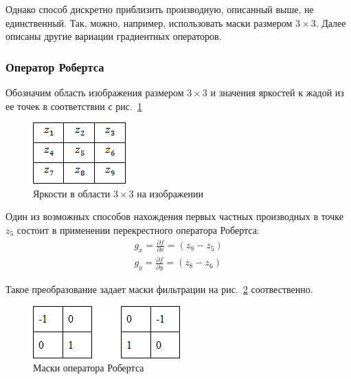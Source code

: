 \documentclass[12pt,a4paper]{article} %
\begin{document}
Однако способ дискретно приблизить производную, описанный выше, не единственный. Так, можно, например, использовать маски размером $3\times3$. Далее описаны другие вариации градиентных операторов.

\subsubsection{Оператор Робертса}

Обозначим область изображения размером $3\times 3$ и значения яркостей к жадой из ее точек в соответствии с рис.~\ref{fig:grad_mask_3}

\begin{figure}[h]
	
	\centering
	
	\includegraphics[width=0.2\linewidth]{grad_mask_3.jpg}
	
	\caption{Яркости в области $3\times3$ на изображении}
	
	\label{fig:grad_mask_3}
	
\end{figure}

Один из возможных способов нахождения первых частных производных в точке~$z_5$ состоит в применении перекрестного оператора Робертса:
\begin{gather}\label{grad_mask_3}
	g_x = \frac{\partial f}{\partial x} = (z_9-z_5)\\
	g_y = \frac{\partial f}{\partial y} = (z_8-z_6)
\end{gather}

Такое преобразование задает маски фильтрации на рис.~\ref{fig:grad_mask_rob} соотвественно.

\begin{figure}[h]
	
	\centering
	
	\includegraphics[width=0.25\linewidth]{grad_mask_rob.jpg}
	
	\caption{Маски оператора Робертса}
	
	\label{fig:grad_mask_rob}
	
\end{figure}
\end{document}
